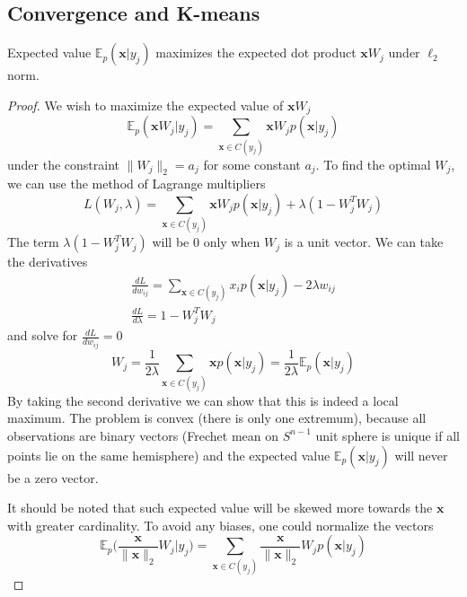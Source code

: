 \documentclass[oneside,english,logo]{amuthesis}
\begin{document}
\subsection{Convergence and K-means}
\begin{theorem}
	\label{theorem:E_x_y_maximizes_xW_under_l2}
Expected value $\mathbb{E}_{p}(\boldsymbol{x}|y_j)$ maximizes the expected dot product $\boldsymbol{x}W_j$ under $\ell_2$ norm.
\end{theorem}
\begin{proof}
We wish to maximize the expected value of $\boldsymbol{x}W_j$
\[
\mathbb{E}_{p}(\boldsymbol{x}W_j|y_j)=\sum_{\boldsymbol{x}\in C(y_j)} \boldsymbol{x} W_j p(\boldsymbol{x}|y_j)
\]
 under the constraint $\lVert W_j \rVert_2 = a_j$ for some constant $a_j$.  To find the optimal $W_j$, we can use the method of Lagrange multipliers
\[
L(W_j,\lambda) = \sum_{\boldsymbol{x}\in C(y_j)} \boldsymbol{x} W_j p(\boldsymbol{x}|y_j) + \lambda(1- W_j^{T}W_j )
\]
The term $\lambda(1- W_j^{T}W_j)$ will be $0$ only when $W_j$ is a unit vector.
We can take the derivatives 
\begin{gather*}
	\frac{d L}{d w_{ij}} = \sum_{\boldsymbol{x}\in C(y_j)} x_i p(\boldsymbol{x}|y_j) - 2\lambda w_{ij} \\
	\frac{d L}{d \lambda} = 1 - W_j^{T}W_j
\end{gather*}
and solve for $\frac{d L}{d w_{ij}}=0$
\[
W_j = \frac{1}{2\lambda }\sum_{\boldsymbol{x}\in C(y_j)} \boldsymbol{x} p(\boldsymbol{x}|y_j)  = \frac{1}{2\lambda } \mathbb{E}_{p}(\boldsymbol{x}|y_j)
\]
By taking the second derivative we can show that this is indeed a local maximum.
The problem is convex (there is only one extremum), because all observations are binary vectors (Frechet mean on $S^{n-1}$ unit sphere is unique if all points lie on the same hemisphere) and the expected value $\mathbb{E}_{p}(\boldsymbol{x}|y_j)$ will never be a zero vector.

It should be noted that such expected value will be skewed more towards the $\boldsymbol{x}$ with greater cardinality. To avoid any biases, one could normalize the vectors 
\[
\mathbb{E}_{p}\big(\frac{\boldsymbol{x}}{\lVert \boldsymbol{x} \rVert_2}W_j|y_j \big)= \sum_{\boldsymbol{x}\in C(y_j)} \frac{\boldsymbol{x}}{\lVert \boldsymbol{x} \rVert_2} W_j p(\boldsymbol{x}|y_j)
\]
\end{proof}
\end{document}
